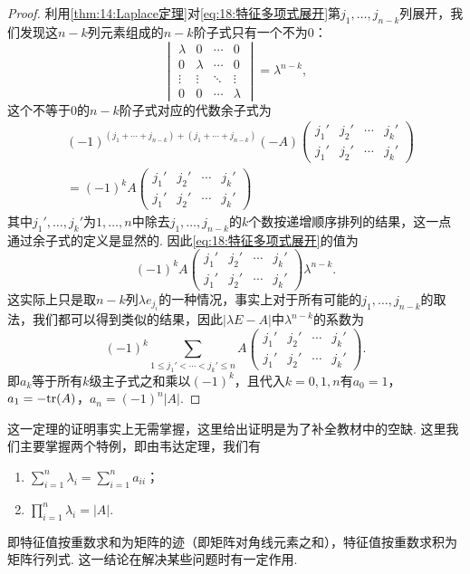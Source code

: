 \begin{proof}
    利用\autoref{thm:14:Laplace定理}对\autoref{eq:18:特征多项式展开}第$j_1,\ldots,j_{n-k}$列展开，我们发现这$n-k$列元素组成的$n-k$阶子式只有一个不为0：
    \[\begin{vmatrix}
            \lambda & 0       & \cdots & 0       \\
            0       & \lambda & \cdots & 0       \\
            \vdots  & \vdots  & \ddots & \vdots  \\
            0       & 0       & \cdots & \lambda
        \end{vmatrix}=\lambda^{n-k},\]
    这个不等于0的$n-k$阶子式对应的代数余子式为
    \begin{align*}
        &(-1)^{(j_1+\cdots+j_{n-k})+(j_1+\cdots+j_{n-k})}(-A)\begin{pmatrix}
            j_1' & j_2' & \cdots & j_k' \\
            j_1' & j_2' & \cdots & j_k'
        \end{pmatrix} \\
        &= (-1)^kA\begin{pmatrix}
            j_1' & j_2' & \cdots & j_k' \\
            j_1' & j_2' & \cdots & j_k'
        \end{pmatrix}
    \end{align*}
    其中$j_1',\ldots,j_k'$为$1,\ldots,n$中除去$j_1,\ldots,j_{n-k}$的$k$个数按递增顺序排列的结果，这一点通过余子式的定义是显然的. 因此\autoref{eq:18:特征多项式展开}的值为
    \[(-1)^kA\begin{pmatrix}
            j_1' & j_2' & \cdots & j_k' \\
            j_1' & j_2' & \cdots & j_k'
        \end{pmatrix}\lambda^{n-k}.\]
    这实际上只是取$n-k$列$\lambda e_{j_i}$的一种情况，事实上对于所有可能的$j_1,\ldots,j_{n-k}$的取法，我们都可以得到类似的结果，因此$|\lambda E-A|$中$\lambda^{n-k}$的系数为
    \[(-1)^k\sum\limits_{1\leqslant j_1'<\cdots<j_k'\leqslant n}A\begin{pmatrix}
            j_1' & j_2' & \cdots & j_k' \\
            j_1' & j_2' & \cdots & j_k'
        \end{pmatrix}.\]
    即$a_k$等于所有$k$级主子式之和乘以$(-1)^k$，且代入$k=0,1,n$有$a_0=1$，$a_1=-\textup{tr}(A)$，$a_n=(-1)^n|A|$.
\end{proof}

这一定理的证明事实上无需掌握，这里给出证明是为了补全教材中的空缺. 这里我们主要掌握两个特例，即由韦达定理，我们有
\begin{enumerate}
    \item $\displaystyle\sum_{i=1}^{n}\lambda_i=\displaystyle\sum_{i=1}^{n}a_{ii}$；

    \item $\displaystyle\prod_{i=1}^{n}\lambda_i=|A|$.
\end{enumerate}
即特征值按重数求和为矩阵的迹（即矩阵对角线元素之和），特征值按重数求积为矩阵行列式. 这一结论在解决某些问题时有一定作用.

